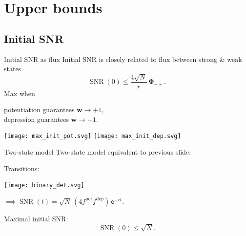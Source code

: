 \documentclass{beamer}%
\newcommand{\w}{\mathbf{w}}
\newcommand{\F}{\boldsymbol{\Phi}}
\DeclareMathOperator{\SNR}{SNR}
\DeclareMathOperator{\snr}{SNR}
\newcommand{\pot}{^{\text{pot}}}
\newcommand{\dep}{^{\text{dep}}}
\renewcommand{\e}{\mathsf{e}}
\begin{document}

\section{Upper bounds}


\subsection{Initial SNR}


\begin{frame}{Initial SNR as flux}
%
 Initial SNR is closely related to flux between strong \& weak states
 \begin{equation*}
   \SNR(0) \leq \frac{4\sqrt{N}}{r}\,\F_{-+}.
 \end{equation*}
 Max when {\parbox[t]{8cm}{potentiation guarantees $\w\to+1$,\\
 depression guarantees $\w\to-1$.}}
 \begin{center}
   \texttt{[image: max\_init\_pot.svg]}
   \hp \hp
   \texttt{[image: max\_init\_dep.svg]}
 \end{center}
%
\end{frame}


\begin{frame}{Two-state model}
%
 Two-state model equivalent to previous slide:
  \begin{center}
  Transitions:
   \parbox{2cm}{\texttt{[image: binary\_det.svg]}}
   $\implies\snr(t)=\sqrt{N}\,(4 f\pot f\dep)\,\e^{-rt}.$
  \end{center}

 \vp Maximal initial SNR:\note[item]{$f\pot=\half$}
 \begin{equation*}
   \snr(0) \leq \sqrt{N}.
 \end{equation*}
%
\end{frame}
\end{document}
